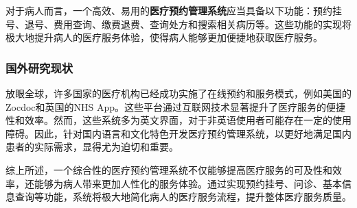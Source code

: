 对于病人而言，一个高效、易用的\textbf{医疗预约管理系统}应当具备以下功能：预约挂号、退号、费用查询、缴费退费、查询处方和搜索相关病历等。这些功能的实现将极大地提升病人的医疗服务体验，使得病人能够更加便捷地获取医疗服务。

\subsubsection{国外研究现状}
放眼全球，许多国家的医疗机构已经成功实施了在线预约和服务模式，例如美国的Zocdoc和英国的NHS App。这些平台通过互联网技术显著提升了医疗服务的便捷性和效率。然而，这些系统多为英文界面，对于非英语使用者可能存在一定的使用障碍。因此，针对国内语言和文化特色开发医疗预约管理系统，以更好地满足国内患者的实际需求，显得尤为迫切和重要。

综上所述，一个综合性的医疗预约管理系统不仅能够提高医疗服务的可及性和效率，还能够为病人带来更加人性化的服务体验。通过实现预约挂号、问诊、基本信息查询等功能，系统将极大地简化病人的医疗服务流程，提升整体医疗服务质量。